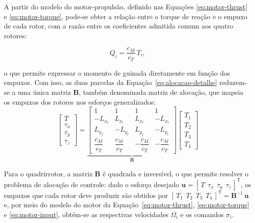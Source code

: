 A partir do modelo do motor-propulsão, definido nas Equações \eqref{eq:motor-thrust} e \eqref{eq:motor-torque}, pode-se obter a relação entre o torque de reação e o empuxo de cada rotor, com a razão entre os coeficientes admitida comum aos quatro rotores:

\begin{equation}
  Q_i = \frac{c_M}{c_T}\,T_i,
  \label{eq:razao-QT}
\end{equation}

o que permite expressar o momento de guinada diretamente em função dos empuxos. Com isso, as duas parcelas da Equação~\eqref{eq:alocacao-detalhe} reduzem-se a uma única matriz $\mathbf{B}$, também denominada matriz de alocação, que mapeia os empuxos dos rotores nos esforços generalizados:
\begin{equation}
    \begin{bmatrix} T \\ \tau_x \\ \tau_y \\ \tau_z \end{bmatrix} =
    \underbrace{\begin{bmatrix}
        1                & 1                & 1                 & 1                 \\
        -L_{x_r}         & L_{x_l}          & L_{x_l}           & -L_{x_r}          \\
        L_{y_f}          & -L_{y_r}         & L_{y_f}           & -L_{y_r}          \\
        \dfrac{c_M}{c_T} & \dfrac{c_M}{c_T} & -\dfrac{c_M}{c_T} & -\dfrac{c_M}{c_T}
    \end{bmatrix}}_{\mathbf{B}}
    \begin{bmatrix} T_1 \\ T_2 \\ T_3 \\ T_4 \end{bmatrix}
    \label{eq:alocacao}
\end{equation}

Para o quadrirrotor, a matriz $\mathbf{B}$ é quadrada e inversível, o que permite resolver o problema de alocação de controle: dado o esforço desejado $\mathbf{u} = [\,T\ \ \tau_x\ \ \tau_y\ \ \tau_z\,]^{\mathsf{T}}$, os empuxos que cada rotor deve produzir são obtidos por $[\,T_1\ \ T_2\ \ T_3\ \ T_4\,]^{\mathsf{T}} = \mathbf{B}^{-1}\,\mathbf{u}$ e, por meio do modelo do motor da Equação~\eqref{eq:motor-thrust}, \eqref{eq:motor-torque} e \eqref{eq:motor-input}, obtém-se as respectivas velocidades $\Omega_i$ e os comandos $\sigma_i$.

